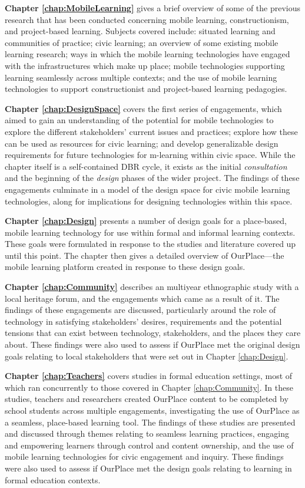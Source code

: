 \textbf{Chapter \ref{chap:MobileLearning}} gives a brief overview of some of the previous research that has been conducted concerning mobile learning, constructionism, and project-based learning. Subjects covered include: situated learning and communities of practice; civic learning; an overview of some existing mobile learning research; ways in which the mobile learning technologies have engaged with the infrastructures which make up place; mobile technologies supporting learning seamlessly across multiple contexts; and the use of mobile learning technologies to support constructionist and project-based learning pedagogies.

\textbf{Chapter \ref{chap:DesignSpace}} covers the first series of engagements, which aimed to gain an understanding of the potential for mobile technologies to explore the different stakeholders’ current issues and practices; explore how these can be used as resources for civic learning; and develop generalizable design requirements for future technologies for m-learning within civic space. While the chapter itself is a self-contained DBR cycle, it exists as the initial \textit{consultation} and the beginning of the \textit{design} phases of the wider project. The findings of these engagements culminate in a model of the design space for civic mobile learning technologies, along for implications for designing technologies within this space.

\textbf{Chapter \ref{chap:Design}} presents a number of design goals for a place-based, mobile learning technology for use within formal and informal learning contexts. These goals were formulated in response to the studies and literature covered up until this point. The chapter then gives a detailed overview of OurPlace---the mobile learning platform created in response to these design goals.

\textbf{Chapter \ref{chap:Community}} describes an multiyear ethnographic study with a local heritage forum, and the engagements which came as a result of it. The findings of these engagements are discussed, particularly around the role of technology in satisfying stakeholders' desires, requirements and the potential tensions that can exist between technology, stakeholders, and the places they care about. These findings were also used to assess if OurPlace met the original design goals relating to local stakeholders that were set out in Chapter \ref{chap:Design}.

\textbf{Chapter \ref{chap:Teachers}} covers studies in formal education settings, most of which ran concurrently to those covered in Chapter \ref{chap:Community}. In these studies, teachers and researchers created OurPlace content to be completed by school students across multiple engagements, investigating the use of OurPlace as a seamless, place-based learning tool. The findings of these studies are presented and discussed through themes relating to seamless learning practices, engaging and empowering learners through control and content ownership, and the use of mobile learning technologies for civic engagement and inquiry. These findings were also used to assess if OurPlace met the design goals relating to learning in formal education contexts.

